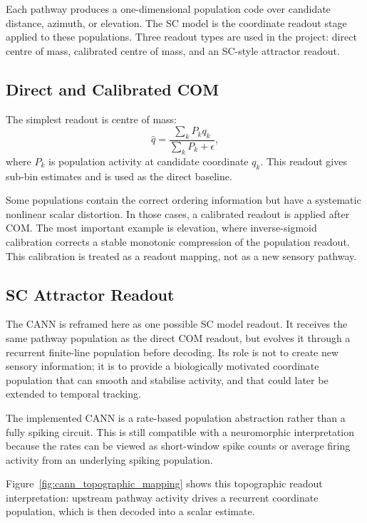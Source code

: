Each pathway produces a one-dimensional population code over candidate distance, azimuth, or elevation. The SC model is the coordinate readout stage applied to these populations. Three readout types are used in the project: direct centre of mass, calibrated centre of mass, and an SC-style attractor readout.

\subsection{Direct and Calibrated COM}

The simplest readout is centre of mass:
\begin{equation}
    \hat{q}
    =
    \frac{\sum_k P_k q_k}{\sum_k P_k+\epsilon},
\end{equation}
where $P_k$ is population activity at candidate coordinate $q_k$. This readout gives sub-bin estimates and is used as the direct baseline.

Some populations contain the correct ordering information but have a systematic nonlinear scalar distortion. In those cases, a calibrated readout is applied after COM. The most important example is elevation, where inverse-sigmoid calibration corrects a stable monotonic compression of the population readout. This calibration is treated as a readout mapping, not as a new sensory pathway.

\subsection{SC Attractor Readout}

The CANN is reframed here as one possible SC model readout. It receives the same pathway population as the direct COM readout, but evolves it through a recurrent finite-line population before decoding. Its role is not to create new sensory information; it is to provide a biologically motivated coordinate population that can smooth and stabilise activity, and that could later be extended to temporal tracking.

The implemented CANN is a rate-based population abstraction rather than a fully spiking circuit. This is still compatible with a neuromorphic interpretation because the rates can be viewed as short-window spike counts or average firing activity from an underlying spiking population.



Figure~\ref{fig:cann_topographic_mapping} shows this topographic readout interpretation: upstream pathway activity drives a recurrent coordinate population, which is then decoded into a scalar estimate.

